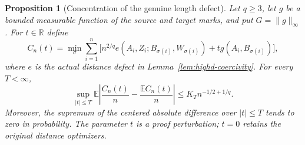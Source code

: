 \documentclass[11pt,reqno]{amsart}
\newtheorem{proposition}[theorem]{Proposition}
\theoremstyle{definition}
\theoremstyle{remark}
\numberwithin{equation}{section}
\newcommand{\R}{\mathbb R}
\newcommand{\E}{\mathbb E}
\begin{document}
\begin{proposition}[Concentration of the genuine length defect]
\label{prop:highd-value-concentration}
Let \(q\ge3\), let \(g\) be a bounded measurable function of
the source and target marks, and put \(G=\|g\|_\infty\).
For \(t\in\R\) define
\[
C_n(t)=\min_\sigma\sum_{i=1}^n
 \bigl[n^{2/q}e(A_i,Z_i;B_{\sigma(i)},W_{\sigma(i)})
       +t g(A_i,B_{\sigma(i)})\bigr],
\]
where \(e\) is the actual distance defect in
Lemma~\ref{lem:highd-coercivity}. For every \(T<\infty\),
\begin{equation}
\sup_{|t|\le T}\E\left|
 \frac{C_n(t)}n-\frac{\E C_n(t)}n\right|
 \le K_T n^{-1/2+1/q}.
\label{eq:highd-value-concentration}
\end{equation}
Moreover, the supremum of the centered absolute difference over
\(|t|\le T\) tends to zero in probability.
The parameter \(t\) is a proof perturbation; \(t=0\) retains
the original distance optimizers.
\end{proposition}
\end{document}
